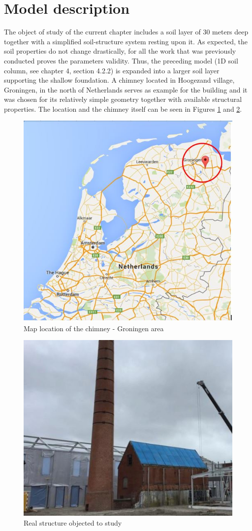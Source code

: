 	\section{Model description}
	The object of study of the current chapter includes a soil layer of 30 meters deep together with a simplified soil-structure system resting upon it. As expected, the soil properties do not change drastically, for all the work that was previously conducted proves the parameters validity. Thus, the preceding model (1D soil column, see chapter 4, section 4.2.2) is expanded into a larger soil layer supporting the shallow foundation. A chimney located in Hoogezand village, Groningen, in  the north of Netherlands serves as example for the building and it was chosen for its relatively simple geometry together with available structural properties. The location and the chimney itself can be seen in Figures \ref{Boom} and \ref{chimney}.
	
	\begin{figure}[!h]
		\centering
		\includegraphics[width=0.5 \linewidth]{"Boomgaard"}
		\caption{Map location of the chimney - Groningen area}
		\label{Boom}
	\end{figure} 
	
	\begin{figure}[!h]
		\centering
		\includegraphics[width=0.5 \linewidth]{"chimney"}
		\caption{Real structure objected to study}
		\label{chimney}
	\end{figure} 

